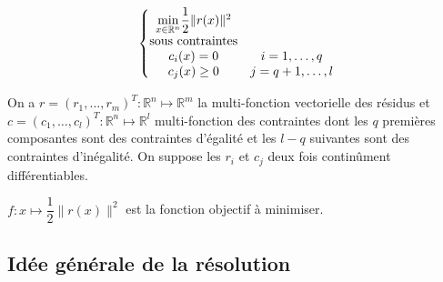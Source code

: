 \documentclass[a4paper,11pt]{article}
\numberwithin{equation}{section}
\begin{document}
\begin{equation} \label{pb}
\left\{ \begin{matrix} \underset{x \in \mathbb{R}^n}{\min}  \dfrac{1}{2}\|r(x)\|^2 \\ 
\textnormal{sous contraintes} \\
c_{i}(x) = 0& i=1,\ldots,q 
\\ c_{j}(x) \geq 0& j=q+1,\ldots,l  \end{matrix} \right. 
\end{equation}

On a $r =(r_{1}, \ldots,r_{m})^{T}: \mathbb{R}^{n} \mapsto \mathbb{R}^{m}$ la multi-fonction vectorielle des résidus et $c = (c_{1}, \ldots, c_{l})^{T}: \mathbb{R}^{n} \mapsto \mathbb{R}^{l}$ multi-fonction des contraintes dont les $q$ premières composantes sont des contraintes d'égalité et les $l-q$ suivantes sont des contraintes d'inégalité. On suppose les $r_{i}$ et $c_{j}$ deux fois continûment différentiables.  

$f:x\mapsto \dfrac{1}{2}\|r(x)\|^{2}$ est la fonction objectif à minimiser.

\subsection{Idée générale de la résolution}
\end{document}
